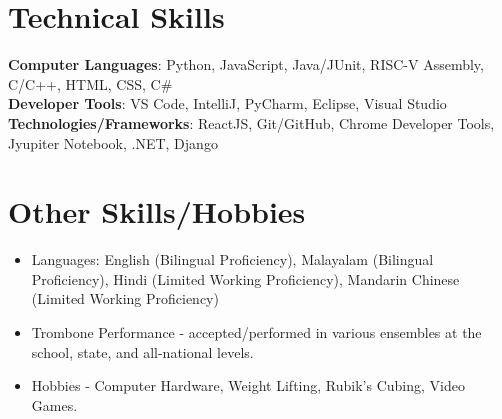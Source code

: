 \documentclass[letterpaper,11pt]{article}
\begin{document}
%
\section{Technical Skills}
 \begin{itemize}[leftmargin=0.15in, label={}]
    \small{\item{
      \textbf{Computer Languages}{: Python, JavaScript, Java/JUnit, RISC-V Assembly, C/C++, HTML, CSS, C\#} \\
      \textbf{Developer Tools}{: VS Code, IntelliJ, PyCharm, Eclipse, Visual Studio} \\
     \textbf{Technologies/Frameworks}{: ReactJS, Git/GitHub, Chrome Developer Tools, Jyupiter Notebook, .NET, Django} \\
    }}

 \end{itemize}
 \vspace{-16pt}
 
 

\section{Other Skills/Hobbies}

    \begin{itemize}
      
      \setlength\itemsep{-1pt}
      \item\small{Languages: English (Bilingual Proficiency), Malayalam (Bilingual Proficiency), Hindi (Limited Working Proficiency), Mandarin Chinese (Limited Working Proficiency)}
      \item{Trombone Performance - accepted/performed in various ensembles at the school, state, and all-national levels.}
      \item{Hobbies - Computer Hardware, Weight Lifting, Rubik's Cubing, Video Games.}
    \end{itemize}
                
\end{document}
